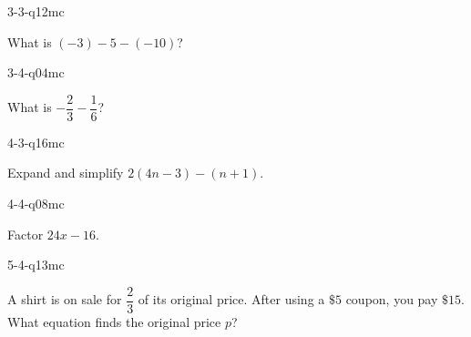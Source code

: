 \begin{practiceQuestion}{3-3-q12}{mc}
\begin{questionText}
What is $(-3) - 5 - (-10)$?
\end{questionText}
\end{practiceQuestion}

\begin{practiceQuestion}{3-4-q04}{mc}
\begin{questionText}
What is $-\dfrac{2}{3} - \dfrac{1}{6}$?
\end{questionText}
\end{practiceQuestion}

\begin{practiceQuestion}{4-3-q16}{mc}
\begin{questionText}
Expand and simplify $2(4n - 3) - (n + 1)$.
\end{questionText}
\end{practiceQuestion}

\begin{practiceQuestion}{4-4-q08}{mc}
\begin{questionText}
Factor $24x - 16$.
\end{questionText}
\end{practiceQuestion}

\begin{practiceQuestion}{5-4-q13}{mc}
\begin{questionText}
A shirt is on sale for $\dfrac{2}{3}$ of its original price. After using a $\$5$ coupon, you pay $\$15$. What equation finds the original price $p$?
\end{questionText}
\end{practiceQuestion}

